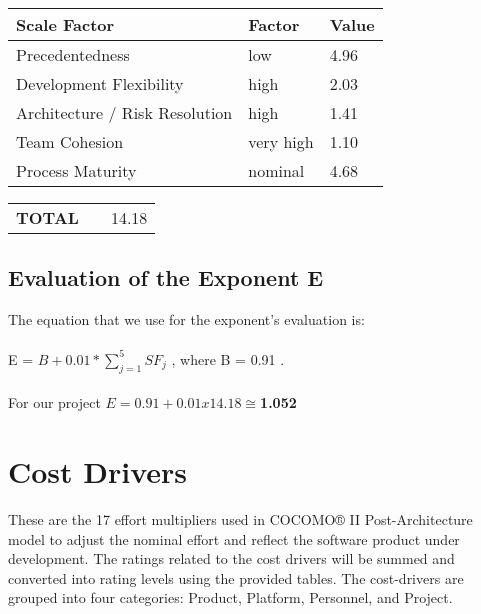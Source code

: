 \begin{center}
  \vspace{0.2cm}
  \begin{tabular}{ l | l | l }%
   	\hline
	\textbf{Scale Factor} & \textbf{Factor} & \textbf{Value}
   	\\ \hline
    Precedentedness & low & 4.96
    \\\hline
    Development Flexibility & high & 2.03
    \\\hline
    Architecture / Risk Resolution & high & 1.41
    \\\hline
    Team Cohesion & very high & 1.10
 	\\\hline
 	Process Maturity & nominal & 4.68
   	\\\hline 
  \end{tabular}
  \begin{tabular}{ l l | l }%
   	\\\textbf{TOTAL} & & 14.18
  \end{tabular}
  \vspace{0.2cm}
\end{center}

\subsection{Evaluation of the Exponent E}
The equation that we use for the exponent's evaluation is:
\\\\E = $B + 0.01 * \sum_{j=1}^{5} SF_j$ , where B = 0.91 .
\\\\For our project $E = 0.91 + 0.01 x 14.18 \cong $\textbf{1.052}

\newpage %
\section{Cost Drivers}
These are the 17 effort multipliers used in COCOMO® II Post-Architecture model to adjust the nominal effort and reflect the software product under development. The ratings related to the cost drivers will be summed and converted into rating levels using the provided tables. The cost-drivers are grouped into four categories: Product, Platform, Personnel, and Project. \\

